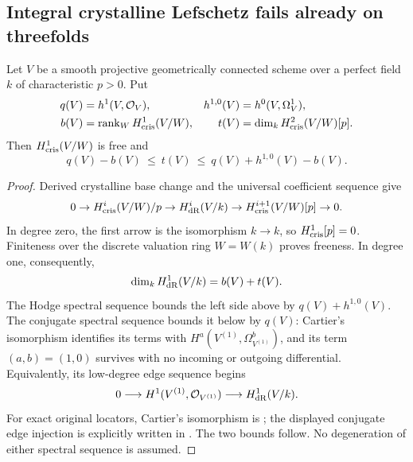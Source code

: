 \subsection{Integral crystalline Lefschetz fails already on threefolds}

\begin{lemma}
\label{lem:OC-first-degree-torsion}
Let $V$ be a smooth projective geometrically connected scheme over a perfect field $k$ of characteristic $p>0$.  Put
\[
\begin{aligned}
 q(V)&=h^1(V,\mathcal O_V),& h^{1,0}(V)&=h^0(V,\Omega_V^1),\\
 b(V)&=\operatorname{rank}_W H^1_{\mathrm{cris}}(V/W),&
 t(V)&=\dim_k H^2_{\mathrm{cris}}(V/W)[p].
\end{aligned}
\]
Then $H^1_{\mathrm{cris}}(V/W)$ is free and
\begin{equation}\label{eq:OC-first-degree-bounds}
 q(V)-b(V)\ \leq\ t(V)\ \leq\ q(V)+h^{1,0}(V)-b(V).
\end{equation}
\end{lemma}
\begin{proof}
Derived crystalline base change and the universal coefficient sequence give
\[
 0\to H^i_{\mathrm{cris}}(V/W)/p\to H^i_{\mathrm{dR}}(V/k)
       \to H^{i+1}_{\mathrm{cris}}(V/W)[p]\to0.
\]
In degree zero, the first arrow is the isomorphism $k\to k$, so $H^1_{\mathrm{cris}}[p]=0$.  Finiteness over the discrete valuation ring $W=W(k)$ proves freeness.  In degree one, consequently,
\[
                  \dim_k H^1_{\mathrm{dR}}(V/k)=b(V)+t(V).
\]
The Hodge spectral sequence bounds the left side above by $q(V)+h^{1,0}(V)$.  The conjugate spectral sequence bounds it below by $q(V)$: Cartier's isomorphism identifies its terms with
$H^a(V^{(1)},\Omega_{V^{(1)}}^b)$, and its term $(a,b)=(1,0)$ survives with no incoming or outgoing differential.  Equivalently, its low-degree edge sequence begins
\[
 0\longrightarrow H^1(V^{(1)},\mathcal O_{V^{(1)}})
                 \longrightarrow H^1_{\mathrm{dR}}(V/k).
\]
For exact original locators, Cartier's isomorphism is
\cite[0, Theorem~2.1.9, p.~515]{Illusie1979DRW}; the displayed conjugate edge injection is explicitly written in
\cite[II, Section~6.14, p.~649]{Illusie1979DRW}.
The two bounds follow.  No degeneration of either spectral sequence is assumed.
\end{proof}

